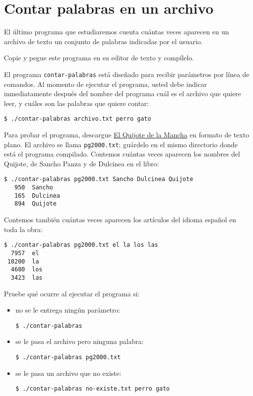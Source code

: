 \chapter{Contar palabras en un archivo}

El último programa que estudiaremos cuenta cuántas veces aparecen en un
archivo de texto un conjunto de palabras indicadas por el usuario.

Copie y pegue este programa en su editor de texto y compílelo.

El programa \lstinline!contar-palabras! está diseñado para recibir
parámetros por línea de comandos. Al momento de ejecutar el programa,
usted debe indicar inmediatamente después del nombre del programa cuál
es el archivo que quiere leer, y cuáles son las palabras que quiere
contar:

\begin{lstlisting}
$ ./contar-palabras archivo.txt perro gato
\end{lstlisting}

Para probar el programa, descargue
\href{http://www.gutenberg.org/ebooks/2000.txt.utf8}{El Quijote de la
Mancha} en formato de texto plano. El archivo se llama
\lstinline!pg2000.txt!; guárdelo en el mismo directorio donde está el
programa compilado. Contemos cuántas veces aparecen los nombres del
Quijote, de Sancho Panza y de Dulcinea en el libro:

\begin{lstlisting}
$ ./contar-palabras pg2000.txt Sancho Dulcinea Quijote
   950  Sancho
   165  Dulcinea
   894  Quijote
\end{lstlisting}

Contemos también cuántas veces aparecen los artículos del idioma español
en toda la obra:

\begin{lstlisting}
$ ./contar-palabras pg2000.txt el la los las
  7957  el
 10200  la
  4680  los
  3423  las
\end{lstlisting}

Pruebe qué ocurre al ejecutar el programa si:

\begin{itemize}
\item
  no se le entrega ningún parámetro:

\begin{lstlisting}
$ ./contar-palabras
\end{lstlisting}
\item
  se le pasa el archivo pero ninguna palabra:

\begin{lstlisting}
$ ./contar-palabras pg2000.txt
\end{lstlisting}
\item
  se le pasa un archivo que no existe:

\begin{lstlisting}
$ ./contar-palabras no-existe.txt perro gato
\end{lstlisting}
\end{itemize}

